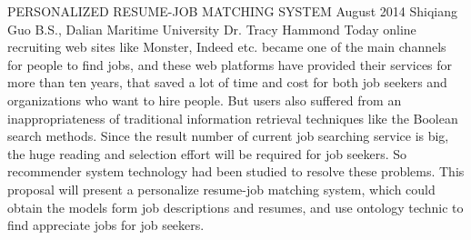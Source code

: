 \begingroup
\absone
{PERSONALIZED RESUME-JOB MATCHING SYSTEM}
{August 2014}
{Shiqiang Guo}
{B.S., Dalian Maritime University}  %
{Dr. Tracy Hammond}%
{
Today online recruiting web sites like Monster, Indeed etc. became one of the main channels for people to find jobs, and these web platforms have provided their services for more than ten years, that saved a lot of time and cost for both job seekers and organizations who want to hire people. But users also suffered  from  an inappropriateness  of  traditional  information  retrieval  techniques like  the  Boolean  search  methods. Since the result number of current job searching service is big, the huge reading and selection effort will be required for job seekers. So recommender system technology had been studied to resolve these problems.  This  proposal will  present  a  personalize resume-job matching system, which could obtain the models form job descriptions and resumes, and use ontology technic to find appreciate jobs for job seekers.
}
\endgroup



